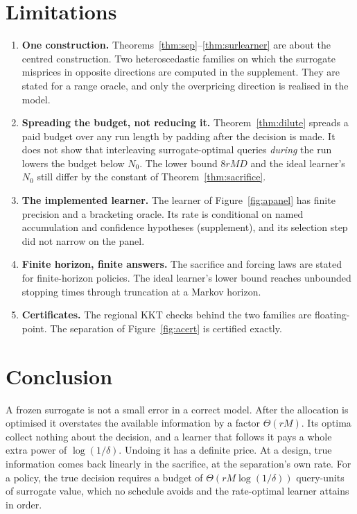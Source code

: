 \section{Limitations}
\label{sec:limits}

\begin{enumerate}
\item[1)] \textbf{One construction.} Theorems~\ref{thm:sep}--\ref{thm:surlearner} are about the
centred construction. Two heteroscedastic families on which the surrogate misprices in opposite
directions are computed in the supplement. They are stated for a range oracle, and only the
overpricing direction is realised in the model.
\item[2)] \textbf{Spreading the budget, not reducing it.} Theorem~\ref{thm:dilute} spreads a
paid budget over any run length by padding after the decision is made. It does not show that
interleaving surrogate-optimal queries \emph{during} the run lowers the budget below $N_{0}$.
The lower bound $8rMD$ and the ideal learner's $N_{0}$ still differ by the constant of
Theorem~\ref{thm:sacrifice}.
\item[3)] \textbf{The implemented learner.} The learner of Figure~\ref{fig:apanel} has finite
precision and a bracketing oracle. Its rate is conditional on named accumulation and
confidence hypotheses (supplement), and its selection step did not narrow on the panel.
\item[4)] \textbf{Finite horizon, finite answers.} The sacrifice and forcing laws are stated for
finite-horizon policies. The ideal learner's lower bound reaches unbounded stopping times
through truncation at a Markov horizon.
\item[5)] \textbf{Certificates.} The regional KKT checks behind the two families are
floating-point. The separation of Figure~\ref{fig:acert} is certified exactly.
\end{enumerate}

\section{Conclusion}

A frozen surrogate is not a small error in a correct model. After the allocation is optimised
it overstates the available information by a factor $\Theta(rM)$. Its optima collect nothing
about the decision, and a learner that follows it pays a whole extra power of $\log(1/\delta)$.
Undoing it has a definite price. At a design, true information comes back linearly in the
sacrifice, at the separation's own rate. For a policy, the true decision requires a budget of
$\Theta(rM\log(1/\delta))$ query-units of surrogate value, which no schedule avoids and the
rate-optimal learner attains in order.

